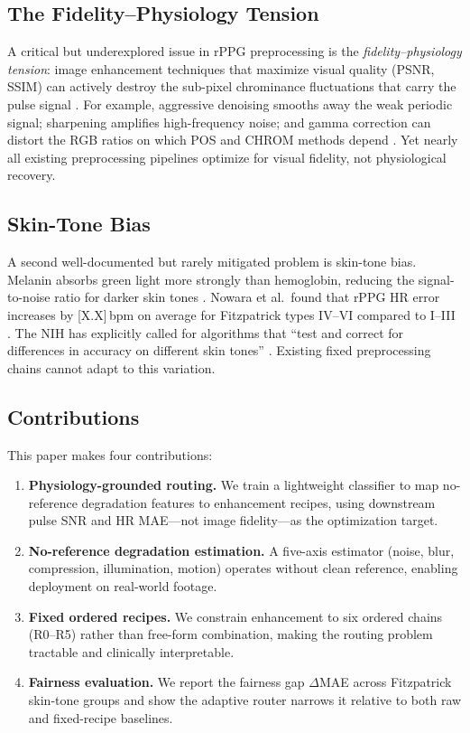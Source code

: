 \documentclass[conference]{IEEEtran}
\begin{document}
\subsection{The Fidelity--Physiology Tension}
\label{subsec:tension}

A critical but underexplored issue in rPPG preprocessing is the \emph{fidelity--physiology tension}: image enhancement techniques that maximize visual quality (PSNR, SSIM) can actively destroy the sub-pixel chrominance fluctuations that carry the pulse signal \cite{wang2016algorithmic}. For example, aggressive denoising smooths away the weak periodic signal; sharpening amplifies high-frequency noise; and gamma correction can distort the RGB ratios on which POS and CHROM methods depend \cite{de2013robust,wang2017pulse}. Yet nearly all existing preprocessing pipelines optimize for visual fidelity, not physiological recovery.

\subsection{Skin-Tone Bias}
\label{subsec:bias}

A second well-documented but rarely mitigated problem is skin-tone bias. Melanin absorbs green light more strongly than hemoglobin, reducing the signal-to-noise ratio for darker skin tones \cite{nowara2020meta}. Nowara et al.\ found that rPPG HR error increases by [X.X]\,bpm on average for Fitzpatrick types IV--VI compared to I--III \cite{nowara2020meta}. The NIH has explicitly called for algorithms that ``test and correct for differences in accuracy on different skin tones'' \cite{nih2021review}. Existing fixed preprocessing chains cannot adapt to this variation.

\subsection{Contributions}
\label{subsec:contributions}

This paper makes four contributions:

\begin{enumerate}
    \item \textbf{Physiology-grounded routing.} We train a lightweight classifier to map no-reference degradation features to enhancement recipes, using downstream pulse SNR and HR MAE---not image fidelity---as the optimization target.
    \item \textbf{No-reference degradation estimation.} A five-axis estimator (noise, blur, compression, illumination, motion) operates without clean reference, enabling deployment on real-world footage.
    \item \textbf{Fixed ordered recipes.} We constrain enhancement to six ordered chains (R0--R5) rather than free-form combination, making the routing problem tractable and clinically interpretable.
    \item \textbf{Fairness evaluation.} We report the fairness gap $\Delta$MAE across Fitzpatrick skin-tone groups and show the adaptive router narrows it relative to both raw and fixed-recipe baselines.
\end{enumerate}
\end{document}
